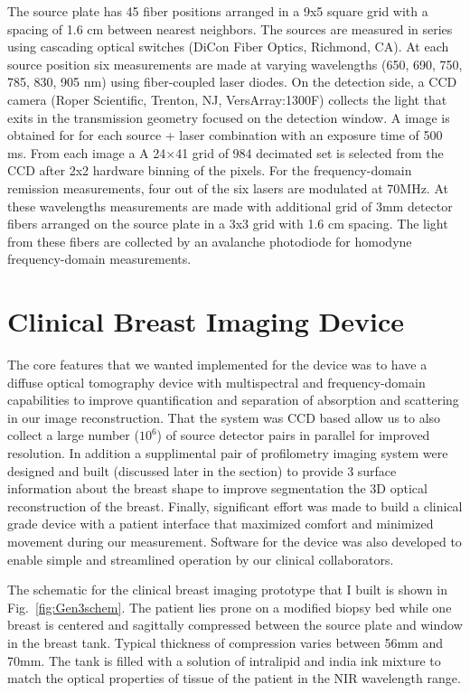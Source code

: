 The source plate has 45 fiber positions arranged in a 9x5 square grid with a spacing of 1.6 cm between nearest neighbors. The sources are measured in series using cascading optical switches (DiCon Fiber Optics, Richmond, CA). At each source position six measurements are made at varying wavelengths (650, 690, 750, 785, 830, 905 nm) using fiber-coupled laser diodes. On the detection side, a CCD camera (Roper Scientific, Trenton, NJ, VersArray:1300F) collects the light that exits in the transmission geometry focused on the detection window. A image is obtained for for each source + laser combination with an exposure time of 500 ms. From each image a  A 24$\times$41 grid of 984  decimated set is selected from the CCD after 2x2 hardware binning of the pixels. For the frequency-domain remission measurements, four out of the six lasers are modulated at 70MHz. At these wavelengths measurements are made with additional grid of 3mm detector fibers arranged on the source plate in a 3x3 grid with 1.6 cm spacing. The light from these fibers are collected by an avalanche photodiode for homodyne frequency-domain measurements.


\section{Clinical Breast Imaging Device}
The core features that we wanted implemented for the device was to have a diffuse optical tomography device with multispectral and frequency-domain capabilities to improve quantification and separation of absorption and scattering in our image reconstruction. That the system was CCD based allow us to also collect a large number ($10^6$) of source detector pairs in parallel for improved resolution. In addition a supplimental pair of profilometry imaging system were designed and built (discussed later in the section) to provide 3 surface information about the breast shape to improve segmentation the 3D optical reconstruction of the breast.  Finally, significant effort was made to build a clinical grade device with a patient interface that maximized comfort and minimized movement during our measurement. Software for the device was also developed to enable simple and streamlined operation by our clinical collaborators.

The schematic for the clinical breast imaging prototype that I built is shown in Fig.~\ref{fig:Gen3schem}. The patient lies prone on a modified biopsy bed while one breast is centered and sagittally compressed between the source plate and window in the breast tank. Typical thickness of compression varies between 56mm and 70mm. The tank is filled with a solution of intralipid and india ink mixture to match the optical properties of tissue of the patient in the NIR wavelength range.

